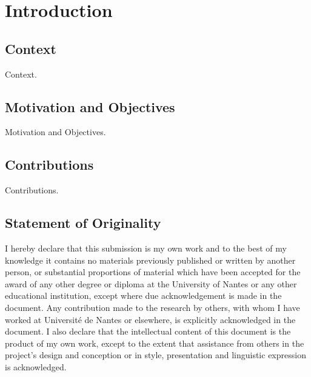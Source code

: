 
\chapter{Introduction}

\section{Context}

Context.

\section{Motivation and Objectives}

Motivation and Objectives.

\section{Contributions}

Contributions.

\section{Statement of Originality}

I hereby declare that this submission is my own work and to the best of my knowledge it contains no materials previously published or written by another person, or substantial proportions of material which have been accepted for the award of any other degree or diploma at the University of Nantes or any other educational institution, except where due acknowledgement is made in the document. Any contribution made to the research by others, with whom I have worked at Université de Nantes or elsewhere, is explicitly acknowledged in the document. I also declare that the intellectual content of this document is the product of my own work, except to the extent that assistance from others in the project's design and conception or in style, presentation and linguistic expression is acknowledged.

